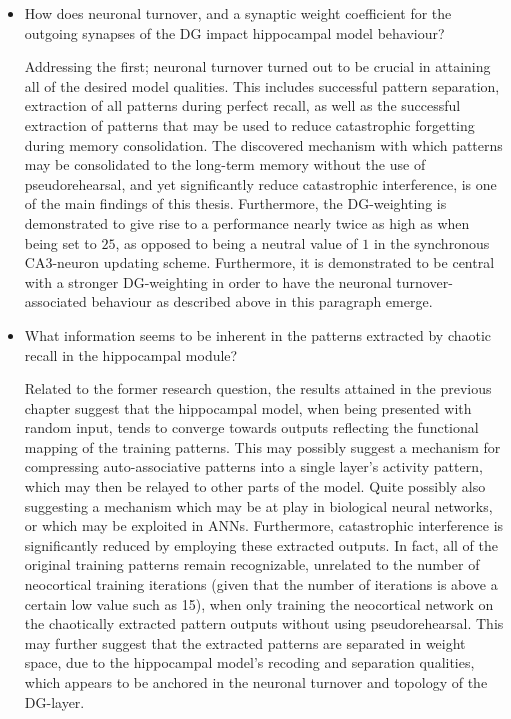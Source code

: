 \begin{itemize}
    \item How does neuronal turnover, and a synaptic weight coefficient for the outgoing synapses of the DG impact hippocampal model behaviour?
    
    Addressing the first; neuronal turnover turned out to be crucial in attaining all of the desired model qualities. This includes successful pattern separation, extraction of all patterns during perfect recall, as well as the successful extraction of patterns that may be used to reduce catastrophic forgetting during memory consolidation. The discovered mechanism with which patterns may be consolidated to the long-term memory without the use of pseudorehearsal, and yet significantly reduce catastrophic interference, is one of the main findings of this thesis.
    Furthermore, the DG-weighting is demonstrated to give rise to a performance nearly twice as high as when being set to $25$, as opposed to being a neutral value of $1$ in the synchronous CA3-neuron updating scheme. Furthermore, it is demonstrated to be central with a stronger DG-weighting in order to have the neuronal turnover-associated behaviour as described above in this paragraph emerge.
    
    \item What information seems to be inherent in the patterns extracted by chaotic recall in the hippocampal module?
    
    Related to the former research question, the results attained in the previous chapter suggest that the hippocampal model, when being presented with random input, tends to converge towards outputs reflecting the functional mapping of the training patterns. This may possibly suggest a mechanism for compressing auto-associative patterns into a single layer's activity pattern, which may then be relayed to other parts of the model. Quite possibly also suggesting a mechanism which may be at play in biological neural networks, or which may be exploited in ANNs. Furthermore, catastrophic interference is significantly reduced by employing these extracted outputs. In fact, all of the original training patterns remain recognizable, unrelated to the number of neocortical training iterations (given that the number of iterations is above a certain low value such as 15), when only training the neocortical network on the chaotically extracted pattern outputs without using pseudorehearsal. This may further suggest that the extracted patterns are separated in weight space, due to the hippocampal model's recoding and separation qualities, which appears to be anchored in the neuronal turnover and topology of the DG-layer.
    

\end{itemize}
